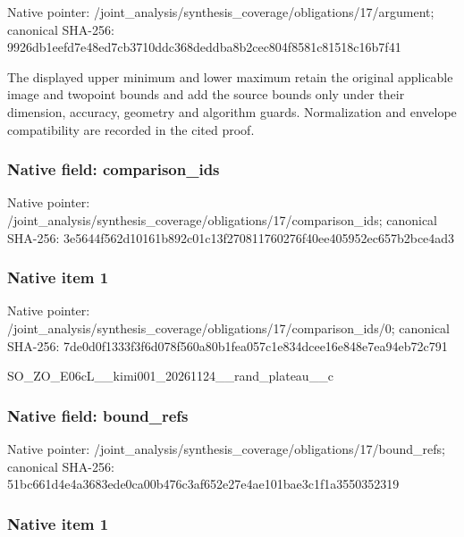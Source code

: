 \documentclass[10pt,a4paper]{article}
\begin{document}
Native pointer: /joint\_analysis/synthesi\allowbreak{}s\_coverage/obligations/1\allowbreak{}7/argument; canonical SHA-256: 9926db1eefd7e48ed7cb3710\allowbreak{}ddc368deddba8b2cec804f85\allowbreak{}81c81518c16b7f41


The displayed upper minimum and lower maximum retain the original applicable image and twopoint bounds and add the source bounds only under their dimension, accuracy, geometry and algorithm guards. Normalization and envelope compatibility are recorded in the cited proof.


\subsubsection{Native field: comparison\_ids}


Native pointer: /joint\_analysis/synthesi\allowbreak{}s\_coverage/obligations/1\allowbreak{}7/comparison\_ids; canonical SHA-256: 3e5644f562d10161b892c01c\allowbreak{}13f270811760276f40ee4059\allowbreak{}52ec657b2bce4ad3



\subsubsection{Native item 1}


Native pointer: /joint\_analysis/synthesi\allowbreak{}s\_coverage/obligations/1\allowbreak{}7/comparison\_ids/0; canonical SHA-256: 7de0d0f1333f3f6d078f560a\allowbreak{}80b1fea057c1e834dcee16e8\allowbreak{}48e7ea94eb72c791


SO\_ZO\_E06cL\_\_kimi001\_202\allowbreak{}61124\_\_rand\_plateau\_\_c


\subsubsection{Native field: bound\_refs}


Native pointer: /joint\_analysis/synthesi\allowbreak{}s\_coverage/obligations/1\allowbreak{}7/bound\_refs; canonical SHA-256: 51bc661d4e4a3683ede0ca00\allowbreak{}b476c3af652e27e4ae101bae\allowbreak{}3c1f1a3550352319



\subsubsection{Native item 1}
\end{document}
